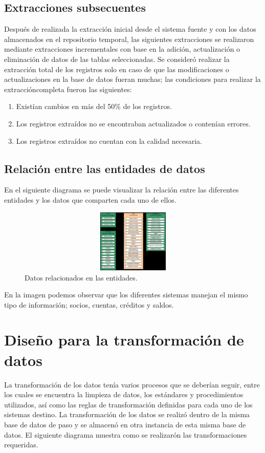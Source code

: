 \documentclass[a4paper,openright,12pt]{book}
\begin{document}
\subsection{Extracciones subsecuentes}
Despu\'es de realizada la extracci\'on inicial desde el sistema fuente y con los datos almacenados en el repositorio temporal, las siguientes extracciones se realizaron mediante extracciones incrementales con base en la adici\'on, actualizaci\'on o eliminaci\'on de datos de las tablas seleccionadas. Se consider\'o realizar la extracci\'on total de los registros solo en caso de que las modificaciones o actualizaciones en la base de datos fueran muchas; las condiciones para realizar la extracci\'oncompleta fueron las siguientes:
\begin{enumerate}
\item Exist\'ian cambios en m\'as del 50\% de los registros.
\item Los registros extra\'idos no se encontraban actualizados o conten\'ian errores.
\item Los registros extra\'idos no cuentan con la calidad necesaria.
\end{enumerate}
\subsection{Relaci\'on entre las entidades de datos}
En el siguiente diagrama se puede visualizar la relaci\'on entre las diferentes entidades y los datos que comparten cada uno de ellos.
\begin{figure}[htb]
  \begin{center}
    \includegraphics[width=12cm, height=3cm, scale=0.5]{Relacion_entidades.jpg}
        \caption{Datos relacionados en las entidades.}
    \label{fig:arquitectura}
  \end{center}
\end{figure}

En la imagen podemos observar que los diferentes sistemas manejan el mismo tipo de informaci\'on; socios, cuentas, cr\'editos y saldos.

\section{Dise\~no para la transformaci\'on de datos}
La transformaci\'on de los datos ten\'ia varios procesos que se deber\'ian seguir, entre los cuales se encuentra la limpieza de datos, los est\'andares y procedimientos utilizados, as\'i como las reglas de transformaci\'on definidas para cada uno de los sistemas destino. La transformaci\'on de los datos se realiz\'o dentro de la misma base de datos de paso y se almacen\'o en otra instancia de esta misma base de datos. El siguiente diagrama muestra como se realizar\'on las transformaciones requeridas.
\end{document}
